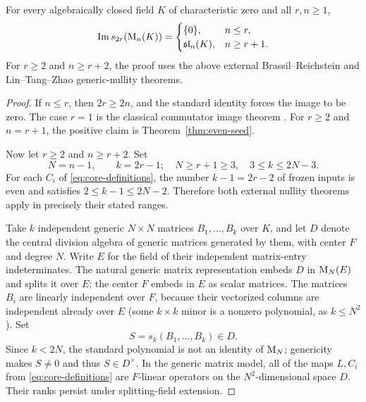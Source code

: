 \begin{theorem}
\label{thm:even-complete}
For every algebraically closed field $K$ of characteristic zero
and all $r,n\ge1$,
\begin{equation}\label{eq:even-complete}
 \operatorname{Im} s_{2r}(\mathrm{M}_n(K))=
 \begin{cases}\{0\},&n\le r,\\\mathfrak{sl}_n(K),&n\ge r+1.\end{cases}
\end{equation}
For $r\ge2$ and $n\ge r+2$, the proof uses the above external
Brassil--Reichstein and Lin--Tang--Zhao generic-nullity theorems.
\end{theorem}
\begin{proof}
If $n\le r$, then $2r\ge2n$, and the standard identity
forces the image to be zero. The case $r=1$ is the classical
commutator image theorem \cite{AlbertMuckenhoupt1957}.
For $r\ge2$ and $n=r+1$, the positive claim is
Theorem~\ref{thm:even-seed}.

Now let $r\ge2$ and $n\ge r+2$. Set
\begin{equation}\label{eq:generic-parameters}
 N=n-1,\qquad k=2r-1;
 \quad N\ge r+1\ge3,\quad 3\le k\le2N-3.
\end{equation}
For each $C_i$ of \eqref{eq:core-definitions}, the number
$k-1=2r-2$ of frozen inputs is even and satisfies
$2\le k-1\le2N-2$. Therefore both external nullity theorems
apply in precisely their stated ranges.

Take $k$ independent generic $N\times N$ matrices
$B_1,\ldots,B_k$ over $K$, and let $D$ denote the central
division algebra of generic matrices generated by them, with
center $F$ and degree $N$. Write $E$ for the field of their
independent matrix-entry indeterminates. The natural generic
matrix representation embeds $D$ in $\mathrm{M}_N(E)$ and splits it
over $E$; the center $F$ embeds in $E$ as scalar matrices.
The matrices $B_i$ are linearly independent over $F$,
because their vectorized columns are independent already over
$E$ (some $k\times k$ minor is a nonzero polynomial, as
$k\le N^2$). Set
\begin{equation}\label{eq:generic-S}
 S=s_k(B_1,\ldots,B_k)\in D.
\end{equation}
Since $k<2N$, the standard polynomial is not an identity
of $\mathrm{M}_N$; genericity makes $S\ne0$ and thus
$S\in D^\times$. In the generic matrix model, all of the
maps $L,C_i$ from \eqref{eq:core-definitions} are
$F$-linear operators on the $N^2$-dimensional space $D$.
Their ranks persist under splitting-field extension.


\end{proof}
